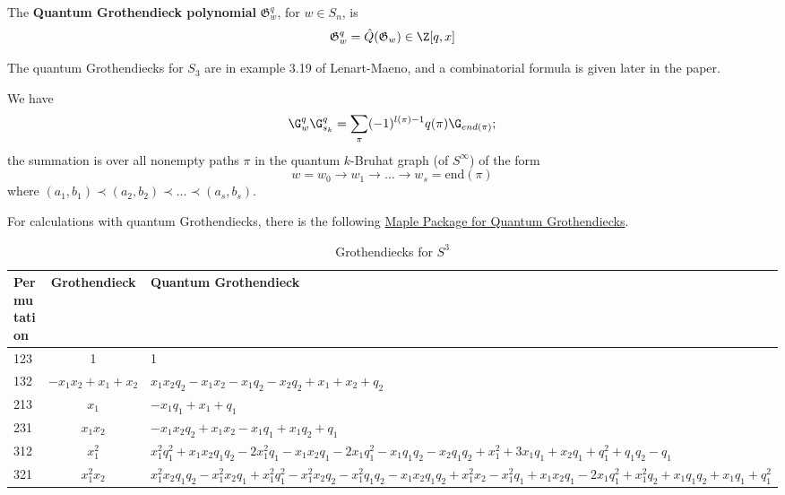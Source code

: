 \documentclass[11pt]{article}
\begin{document}
\begin{definition}
    The \textbf{Quantum Grothendieck polynomial} $\mathfrak{G}_w^q$, for $w \in S_n$, is
    \begin{equation*}
        \mathfrak{G}_w^q = \hat{Q}(\mathfrak{G}_w) \in \Z[q,x]
    \end{equation*}
\end{definition}
The quantum Grothendiecks for $S_3$ are in example 3.19 of Lenart-Maeno, and a combinatorial formula is given later in the paper. \\

\begin{theorem}

We have
\begin{equation*}
    \G_w^q \G_{s_k}^q = \sum_\pi (-1)^{l(\pi)- 1}q(\pi) \G_{end(\pi)} ; 
\end{equation*}
the summation is over all nonempty paths $\pi$ in the quantum $k$-Bruhat graph (of $S^\infty$) of the form 
\begin{equation*}
    w = w_0 \rightarrow w_1 \rightarrow \ldots \rightarrow w_s = \text{end}(\pi)
\end{equation*}
where $(a_1, b_1) \prec (a_2,b_2) \prec \ldots \prec (a_s,b_s)$.
\end{theorem}

For calculations with quantum Grothendiecks, there is the following \href{https://ow3.math.rutgers.edu/~asbuch/equivcalc/}{Maple Package for Quantum Grothendiecks}.

\newpage

\begin{table}[!h]
\centering
\caption{Grothendiecks for $S^3$}
\begin{tabular}{|p{2cm}|c|p{10cm}|}
\hline
Permutation &  Grothendieck  &  Quantum Grothendieck  \\ \hline
123 & 1 & 1 \\ \hline
132 & $-x_1x_2 + x_1 + x_2$ & $x_1x_2q_2 - x_1x_2 - x_1q_2 - x_2q_2 + x_1 + x_2 + q_2$ \\ \hline
213 & $x_1$ & $-x_1q_1 + x_1 + q_1$ \\ \hline
231 & $x_1x_2$ & $-x_1x_2q_2 + x_1x_2 - x_1q_1 + x_1q_2 + q_1$ \\ \hline
312 & $x_1^2$ & $
    x_1^2q_1^2 + x_1x_2q_1q_2  - 2x_1^2q_1 - x_1x_2q_1 - 2x_1q_1^2 - x_1q_1q_2 
    - x_2q_1q_2 + x_1^2 + 3x_1q_1 + x_2q_1 + q_1^2 + q_1q_2 - q_1$ \\ \hline 
321 & $x_1^2x_2$ & $x_1^2x_2q_1q_2 - x_1^2x_2q_1 + x_1^2q_1^2 - x_1^2x_2q_2 - x_1^2q_1q_2 - x_1x_2q_1q_2 + x_1^2x_2 - x_1^2q_1 + x_1x_2q_1 - 2x_1q_1^2 + x_1^2q_2 + x_1q_1q_2 + x_1q_1 + q_1^2$ \\ \hline 
\end{tabular}
\end{table}
\end{document}
